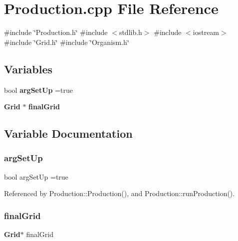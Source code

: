 \section{Production.\+cpp File Reference}
\label{Production_8cpp}
{\ttfamily \#include \char`\"{}Production.\+h\char`\"{}}\newline
{\ttfamily \#include $<$stdlib.\+h$>$}\newline
{\ttfamily \#include $<$iostream$>$}\newline
{\ttfamily \#include \char`\"{}Grid.\+h\char`\"{}}\newline
{\ttfamily \#include \char`\"{}Organism.\+h\char`\"{}}\newline
\subsection*{Variables}
\begin{DoxyCompactItemize}
\item 
bool \textbf{ arg\+Set\+Up} =true
\item 
\textbf{ Grid} $\ast$ \textbf{ final\+Grid}
\end{DoxyCompactItemize}


\subsection{Variable Documentation}
\mbox{\label{Production_8cpp_a93df441d853a9c6e32f2725da66fa38b}} 
\subsubsection{arg\+Set\+Up}
{\footnotesize\ttfamily bool arg\+Set\+Up =true}



Referenced by Production\+::\+Production(), and Production\+::run\+Production().

\mbox{\label{Production_8cpp_acea9cff1e9553dfffe9a5769e0eb6d27}} 
\subsubsection{final\+Grid}
{\footnotesize\ttfamily \textbf{ Grid}$\ast$ final\+Grid}


